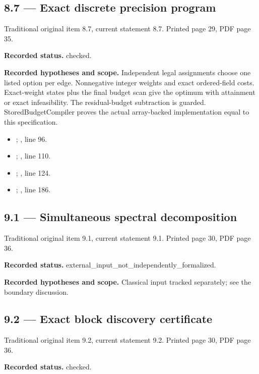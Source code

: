 \subsection{8.7 — Exact discrete precision program}
\label{result:8.7}
{\footnotesize\color{muted}Traditional original item 8.7, current statement 8.7. Printed page 29, PDF page 35.}\par
\textbf{Recorded status.} checked.

\textbf{Recorded hypotheses and scope.} Independent legal assignments choose one listed option per edge. Nonnegative integer weights and exact ordered-field costs. Exact-weight states plus the final budget scan give the optimum with attainment or exact infeasibility. The residual-budget subtraction is guarded. StoredBudgetCompiler proves the actual array-backed implementation equal to this specification.

\begin{itemize}
\item {}; , line 96.
\item {}; , line 110.
\item {}; , line 124.
\item {}; , line 186.
\end{itemize}
\subsection{9.1 — Simultaneous spectral decomposition}
\label{result:9.1}
{\footnotesize\color{muted}Traditional original item 9.1, current statement 9.1. Printed page 30, PDF page 36.}\par
\textbf{Recorded status.} external\_input\_not\_independently\_formalized.

\textbf{Recorded hypotheses and scope.} Classical input tracked separately; see the boundary discussion.

\subsection{9.2 — Exact block discovery certificate}
\label{result:9.2}
{\footnotesize\color{muted}Traditional original item 9.2, current statement 9.2. Printed page 30, PDF page 36.}\par
\textbf{Recorded status.} checked.

